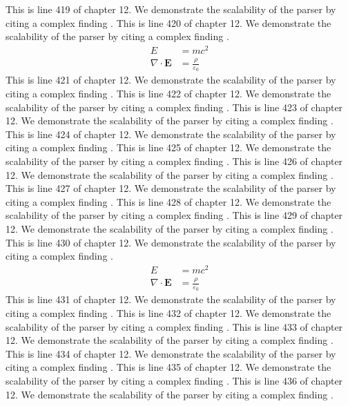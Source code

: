 This is line 419 of chapter 12. We demonstrate the scalability of the parser by citing a complex finding \cite{ref12_419}.
This is line 420 of chapter 12. We demonstrate the scalability of the parser by citing a complex finding \cite{ref12_420}.
\begin{align*}
  E &= mc^2 \\
  \nabla \cdot \mathbf{E} &= \frac{\rho}{\varepsilon_0}
\end{align*}
This is line 421 of chapter 12. We demonstrate the scalability of the parser by citing a complex finding \cite{ref12_421}.
This is line 422 of chapter 12. We demonstrate the scalability of the parser by citing a complex finding \cite{ref12_422}.
This is line 423 of chapter 12. We demonstrate the scalability of the parser by citing a complex finding \cite{ref12_423}.
This is line 424 of chapter 12. We demonstrate the scalability of the parser by citing a complex finding \cite{ref12_424}.
This is line 425 of chapter 12. We demonstrate the scalability of the parser by citing a complex finding \cite{ref12_425}.
This is line 426 of chapter 12. We demonstrate the scalability of the parser by citing a complex finding \cite{ref12_426}.
This is line 427 of chapter 12. We demonstrate the scalability of the parser by citing a complex finding \cite{ref12_427}.
This is line 428 of chapter 12. We demonstrate the scalability of the parser by citing a complex finding \cite{ref12_428}.
This is line 429 of chapter 12. We demonstrate the scalability of the parser by citing a complex finding \cite{ref12_429}.
This is line 430 of chapter 12. We demonstrate the scalability of the parser by citing a complex finding \cite{ref12_430}.
\begin{align*}
  E &= mc^2 \\
  \nabla \cdot \mathbf{E} &= \frac{\rho}{\varepsilon_0}
\end{align*}
This is line 431 of chapter 12. We demonstrate the scalability of the parser by citing a complex finding \cite{ref12_431}.
This is line 432 of chapter 12. We demonstrate the scalability of the parser by citing a complex finding \cite{ref12_432}.
This is line 433 of chapter 12. We demonstrate the scalability of the parser by citing a complex finding \cite{ref12_433}.
This is line 434 of chapter 12. We demonstrate the scalability of the parser by citing a complex finding \cite{ref12_434}.
This is line 435 of chapter 12. We demonstrate the scalability of the parser by citing a complex finding \cite{ref12_435}.
This is line 436 of chapter 12. We demonstrate the scalability of the parser by citing a complex finding \cite{ref12_436}.
